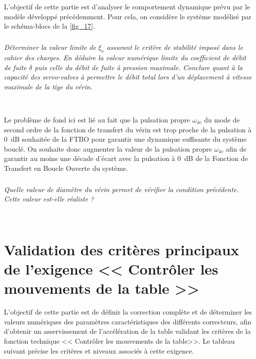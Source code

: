\documentclass[10pt,fleqn]{article} %
\begin{document}
L’objectif de cette partie est d’analyser le comportement dynamique prévu par le modèle développé précédemment.
Pour cela, on considère le système modélisé par le schéma-blocs de la \autoref{fig_17}.

\subparagraph{\label{q_35}}\textit{Déterminer la valeur limite de $\xi_v$ assurant le critère de stabilité imposé dans le cahier des
charges. En déduire la valeur numérique limite du coefficient de débit de fuite $\delta$ puis celle du
débit de fuite à pression maximale. Conclure quant à la capacité des servo-valves à permettre
le débit total lors d’un déplacement à vitesse maximale de la tige du vérin.}
\ifprof
\begin{corrige} ~\\

\end{corrige}
\else
\fi

Le problème de fond ici est lié au fait que la pulsation propre $\omega_{4v}$ du mode de second ordre de la fonction
de transfert du vérin est trop proche de la pulsation à \SI{0}{dB} souhaitée de la FTBO pour garantir une dynamique
suffisante du système bouclé. On souhaite donc augmenter la valeur de la pulsation propre $\omega_{4v}$ afin de garantir
au moins une décade d’écart avec la pulsation à \SI{0}{dB} de la Fonction de Transfert en Boucle Ouverte du système.

\subparagraph{\label{q_36}}\textit{Quelle valeur de diamètre du vérin permet de vérifier la condition précédente. Cette valeur
est-elle réaliste ?}
\ifprof
\begin{corrige} ~\\

\end{corrige}
\else
\fi

\section{Validation des critères principaux
de l’exigence << Contrôler les
mouvements de la table >>}
\begin{obj}
L’objectif de cette partie est de définir la correction complète et de déterminer les valeurs
numériques des paramètres caractéristiques des différents correcteurs, afin d’obtenir un asservissement de
l’accélération de la table validant les critères de la fonction technique << Contrôler les mouvements de la table>>.
Le tableau suivant précise les critères et niveaux associés à cette exigence.
\end{obj}
\end{document}
